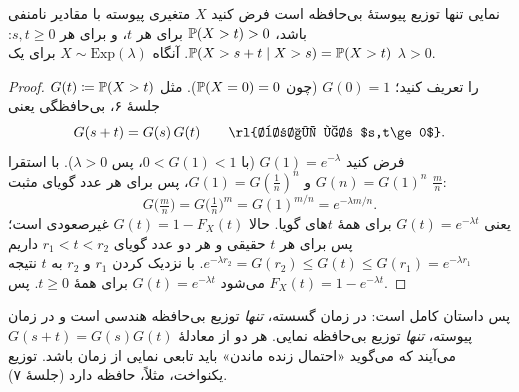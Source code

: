 \begin{theorem}[label=thm:exp-unique]{نمایی تنها توزیع پیوستهٔ بی‌حافظه است}
فرض کنید $X$ متغیری پیوسته با مقادیر نامنفی باشد، $\P(X>t)>0$ برای هر $t$، و برای هر $s,t\ge0$:
$\P(X>s+t\mid X>s)=\P(X>t)$. آنگاه $X\sim\mathrm{Exp}(\lambda)$ برای یک $\lambda>0$.
\end{theorem}

\begin{proof}
$G(t)\defeq\P(X>t)$ را تعریف کنید؛ $G(0)=1$ (چون $\P(X=0)=0$). مثل جلسهٔ ۶، بی‌حافظگی یعنی
\[ G(s+t)=G(s)\,G(t)\qquad\text{\rl{برای هر $s,t\ge0$}}. \]
فرض کنید $G(1)=e^{-\lambda}$ (با $0<G(1)<1$، پس $\lambda>0$). با استقرا $G(n)=G(1)^n$ و $G(1)=G(\tfrac1n)^n$، پس برای هر عدد گویای مثبت $\tfrac mn$:
\[ G\bigl(\tfrac mn\bigr)=G\bigl(\tfrac1n\bigr)^m=G(1)^{m/n}=e^{-\lambda m/n}. \]
یعنی $G(t)=e^{-\lambda t}$ برای همهٔ $t$های گویا. حالا $G(t)=1-F_X(t)$ غیرصعودی است؛ پس برای هر $t$ حقیقی و هر دو عدد گویای $r_1<t<r_2$ داریم $e^{-\lambda r_2}=G(r_2)\le G(t)\le G(r_1)=e^{-\lambda r_1}$. با نزدیک کردن $r_1$ و $r_2$ به $t$ نتیجه می‌شود $G(t)=e^{-\lambda t}$ برای همهٔ $t\ge0$. پس $F_X(t)=1-e^{-\lambda t}$.
\end{proof}

\begin{note}
پس داستان کامل است: در زمان گسسته، \emph{تنها} توزیع بی‌حافظه هندسی است و در زمان پیوسته، \emph{تنها} توزیع بی‌حافظه نمایی. هر دو از معادلهٔ $G(s+t)=G(s)G(t)$ می‌آیند که می‌گوید «احتمال زنده ماندن» باید تابعی نمایی از زمان باشد. توزیع یکنواخت، مثلاً، حافظه دارد (جلسهٔ ۷).
\end{note}

